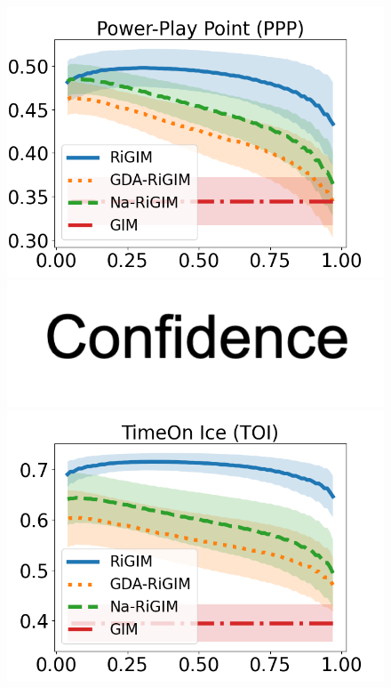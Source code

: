 \documentclass[letterpaper]{article} %
\begin{document}
\begin{figure}[htbp]
\begin{minipage}{0.16\textwidth}
    \includegraphics[scale=0.16]{figures/risk_curve_PPP_shadow.png}\par
    \vspace{-0.05in}
    \includegraphics[scale=0.12]{figures/confidence_x_label.png}
    \end{minipage}
    \begin{minipage}{0.16\textwidth}
    \centering
    \includegraphics[scale=0.16]{figures/risk_curve_GP_shadow.png}\par

\end{minipage}
\end{figure}
\end{document}
